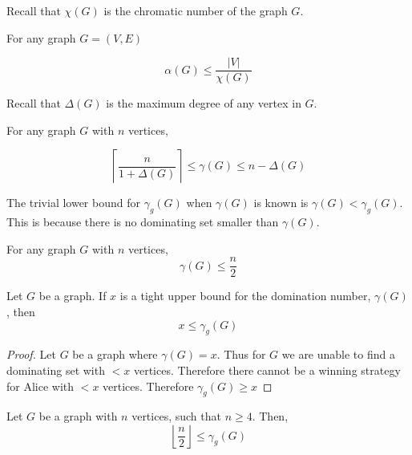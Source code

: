 Recall that $\chi(G)$ is the chromatic number of the graph $G$.

\begin{theorem}  \label{willis3.1}
    For any graph $G = (V,E)$ 

    \[\alpha(G) \leq \frac{ \left | {V} \right |}{\chi(G)}\]
\end{theorem}

Recall that $\Delta(G)$ is the maximum degree of any vertex in $G$.

\begin{theorem}  \label{balakrishnan10.3.2}
    For any graph $G$ with $n$ vertices, 
    
    \[ \left\lceil {\frac{n}{1+\Delta(G)}} \right\rceil \leq \gamma(G) \leq n - \Delta(G)\]    
\end{theorem}
    
    The trivial lower bound for $\gamma_g(G)$ when $\gamma(G)$ is known is $\gamma(G) < \gamma_g(G)$. This is because there is no dominating set smaller than $\gamma(G)$. 
    
\begin{theorem} \label{oreDomUpper} 
    For any graph $G$ with $n$ vertices,     
    \[\gamma(G) \leq \frac{n}{2}\]
\end{theorem}


\begin{theorem}\label{gameupper}
    Let $G$ be a graph. If $x$ is a tight upper bound for the domination number, $\gamma(G)$, then      
    \[x \leq  \gamma_g(G)\]
\end{theorem}

\begin{proof}
    Let $G$ be a graph where $\gamma(G) = x$.
    Thus for $G$ we are unable to find a dominating set with $ < x$ vertices.
    Therefore there cannot be a winning strategy for Alice with $< x$ vertices.
    Therefore $\gamma_g(G) \geq x$
\end{proof}


\begin{theorem} \label{gameDomNumLowerBound}
    Let $G$ be a graph with $n$ vertices, such that $n \geq 4$. Then,    
    \[  \left \lfloor{\frac{n}{2}}\right \rfloor \leq \gamma_g(G)  \]
    
\end{theorem}


